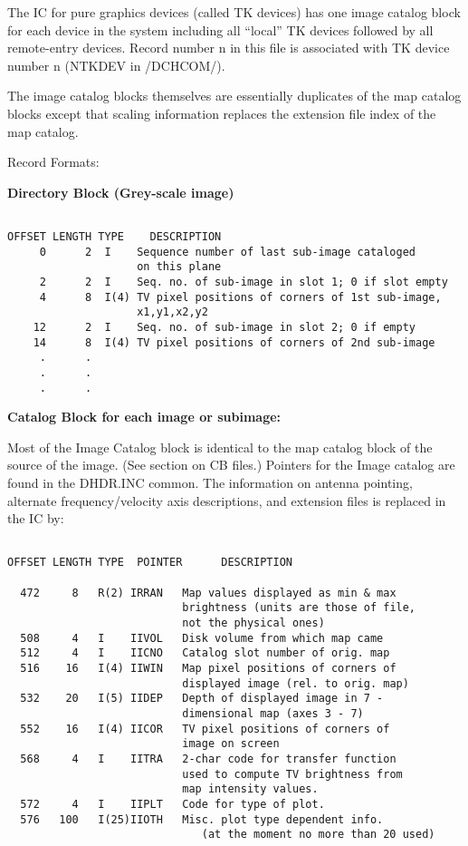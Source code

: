      The IC for pure graphics devices (called TK devices) has one
image catalog block for each device in the system including all ``local''
TK devices followed by all remote-entry devices.  Record number n in
this file is associated with TK device number n (NTKDEV in /DCHCOM/).

   The image catalog blocks themselves are essentially duplicates of
the map catalog blocks except that scaling information replaces the
extension file index of the map catalog.


Record Formats:

{\bf Directory Block (Grey-scale image)}
\begin{verbatim}

OFFSET LENGTH TYPE    DESCRIPTION
     0      2  I    Sequence number of last sub-image cataloged
                    on this plane
     2      2  I    Seq. no. of sub-image in slot 1; 0 if slot empty
     4      8  I(4) TV pixel positions of corners of 1st sub-image,
                    x1,y1,x2,y2
    12      2  I    Seq. no. of sub-image in slot 2; 0 if empty
    14      8  I(4) TV pixel positions of corners of 2nd sub-image
     .      .
     .      .
     .      .
\end{verbatim}

{\bf Catalog Block for each image or subimage:}

     Most of the Image Catalog block is identical to the map
catalog block of the source of the image.  (See section on CB files.)
Pointers for the Image catalog are found in the DHDR.INC common.
The information on antenna pointing, alternate frequency/velocity
axis descriptions, and extension files is replaced in the IC by:
\begin{verbatim}

OFFSET LENGTH TYPE  POINTER      DESCRIPTION

  472     8   R(2) IRRAN   Map values displayed as min & max
                           brightness (units are those of file,
                           not the physical ones)
  508     4   I    IIVOL   Disk volume from which map came
  512     4   I    IICNO   Catalog slot number of orig. map
  516    16   I(4) IIWIN   Map pixel positions of corners of
                           displayed image (rel. to orig. map)
  532    20   I(5) IIDEP   Depth of displayed image in 7 -
                           dimensional map (axes 3 - 7)
  552    16   I(4) IICOR   TV pixel positions of corners of
                           image on screen
  568     4   I    IITRA   2-char code for transfer function
                           used to compute TV brightness from
                           map intensity values.
  572     4   I    IIPLT   Code for type of plot.
  576   100   I(25)IIOTH   Misc. plot type dependent info.
                              (at the moment no more than 20 used)
\end{verbatim}


